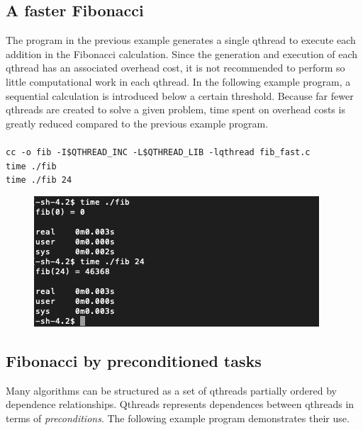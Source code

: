 \documentclass[12pt,fullpage]{article}
\begin{document}
\subsection{A faster Fibonacci}
The program in the previous example generates a single qthread to execute each addition in the Fibonacci calculation.  Since the generation and execution of each qthread has an associated overhead cost, it is not recommended to perform so little computational work in each qthread.  In the following example program, a sequential calculation is introduced below a certain threshold. Because far fewer qthreads are created to solve a given problem, time spent on overhead costs is greatly reduced compared to the previous example program.
\\  \\
{\footnotesize{\tt cc -o fib -I\$QTHREAD\_INC -L\$QTHREAD\_LIB -lqthread fib\_fast.c}}
\\
{\footnotesize{\tt time ./fib}}
\\
{\footnotesize{\tt time ./fib 24}}

\begin{figure}[h]
\includegraphics{images/fib_fast.png}
\end{figure}
\newpage


\subsection{Fibonacci by preconditioned tasks}

Many algorithms can be structured as a set of qthreads partially ordered by dependence relationships.  Qthreads represents dependences between qthreads in terms of {\it preconditions}.  The following example program demonstrates their use.
\\

\end{document}
